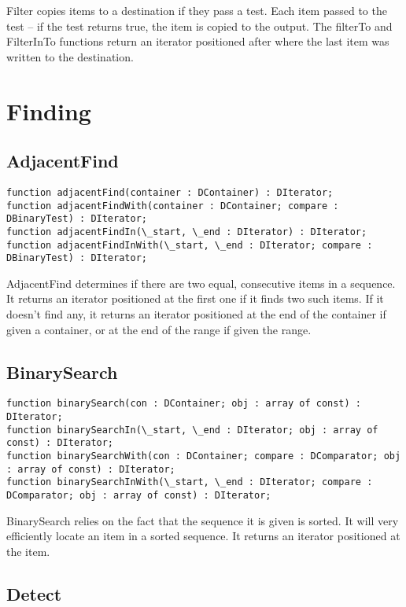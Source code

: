 \documentclass{report}
\begin{document}
Filter copies items to a destination if they pass a test.  Each item passed
to the test -- if the test returns true, the item is copied to the output. 
The filterTo and FilterInTo functions return an iterator positioned after
where the last item was written to the destination.

\section{Finding}

\subsection{AdjacentFind}

\begin{lstlisting}
function adjacentFind(container : DContainer) : DIterator;
function adjacentFindWith(container : DContainer; compare : DBinaryTest) : DIterator;
function adjacentFindIn(\_start, \_end : DIterator) : DIterator;
function adjacentFindInWith(\_start, \_end : DIterator; compare : DBinaryTest) : DIterator;
\end{lstlisting}

AdjacentFind determines if there are two equal, consecutive items in a
sequence. It returns an iterator positioned at the first one if it finds two
such items. If it doesn't find any, it returns an iterator positioned at the
end of the container if given a container, or at the end of the range if given the range.

\subsection{BinarySearch}

\begin{lstlisting}
function binarySearch(con : DContainer; obj : array of const) : DIterator;
function binarySearchIn(\_start, \_end : DIterator; obj : array of const) : DIterator;
function binarySearchWith(con : DContainer; compare : DComparator; obj : array of const) : DIterator;
function binarySearchInWith(\_start, \_end : DIterator; compare : DComparator; obj : array of const) : DIterator;
\end{lstlisting}

BinarySearch relies on the fact that the sequence it is given is sorted. It
will very efficiently locate an item in a sorted sequence. It returns an
iterator positioned at the item.

\subsection{Detect}
\end{document}
